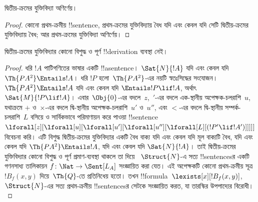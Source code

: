 \documentclass[../../../include/open-logic-section]{subfiles}
\begin{document}



\begin{thm}
দ্বিতীয়-ক্রমের যুক্তিবিদ্যা অণির্ণেয়।
\end{thm}

\begin{proof}
কোনো প্রথম-ক্রমীয় !!{sentence}, প্রথম-ক্রমের যুক্তিবিদ্যায় বৈধ যদি এবং
কেবল যদি সেটি দ্বিতীয়-ক্রমের যুক্তিবিদ্যায় বৈধ; আর প্রথম-ক্রমের
যুক্তিবিদ্যা অণির্ণেয়।
\end{proof}

\begin{thm}
দ্বিতীয়-ক্রমের যুক্তিবিদ্যার কোনো বিশুদ্ধ ও পূর্ণ !!{derivation} ব্যবস্থা
নেই।
\end{thm}

\begin{proof}
ধরি $!A$ পাটিগণিতের ভাষার একটি !!a{sentence}। $\Sat{N}{!A}$ যদি এবং
কেবল যদি $\Th{PA^2} \Entails !A$। ধরি $!P$ হলো~$\Th{PA^2}$-এর নয়টি
স্বতঃসিদ্ধের সংযোজন। $\Th{PA^2} \Entails !A$ যদি এবং কেবল যদি
$\Entails !P \lif !A$, অর্থাৎ $\Sat{M}{!P \lif !A}$।
এবার~$\Obj{0}$-এর বদলে~$z$,~$\prime$-এর বদলে এক-স্থানীয়
অপেক্ষক-চলরাশি~$u$, যথাক্রমে $+$ ও~$\times$-এর বদলে দ্বি-স্থানীয়
অপেক্ষক-চলরাশি~$u'$ ও~$u''$, এবং $<$-এর বদলে দ্বি-স্থানীয়
সম্পর্ক-চলরাশি~$L$ বসিয়ে ও সার্বিকভাবে পরিমাণায়ন করে পাওয়া
!!{sentence}
$\lforall[z][\lforall[u][\lforall[u'][\lforall[u''][\lforall[L][(!P' \lif !A')]]]]]$
বিবেচনা করি। এটি বিশুদ্ধ দ্বিতীয়-ক্রমের যুক্তিবিদ্যার একটি বৈধ বাক্য
যদি এবং কেবল যদি মূল বাক্যটি বৈধ, যদি এবং কেবল যদি $\Th{PA^2}
\Entails !A$, যদি এবং কেবল যদি $\Sat{N}{!A}$। তাই দ্বিতীয়-ক্রমের
যুক্তিবিদ্যার কোনো বিশুদ্ধ ও পূর্ণ প্রমাণ-ব্যবস্থা থাকলে তা দিয়ে
~$\Struct{N}$-এ সত্য !!{sentence}sর একটি গণনসাধ্য তালিকায়ন
$f\colon \Nat \to \Sent[L_A]$ সংজ্ঞায়িত করা যেত। এই অপেক্ষকটি কোনো
প্রথম-ক্রমীয় সূত্র~$!B_f(x, y)$ দিয়ে~$\Th{Q}$-তে প্রতিনিধেয় হতো। তখন
!!{formula}~$\lexists[x][!B_f(x, y)]$,~$\Struct{N}$-এর সত্য
প্রথম-ক্রমীয় !!{sentence}sর সেটকে সংজ্ঞায়িত করত, যা তারস্কির
উপপাদ্যের বিরোধী।
\end{proof}
\end{document}
